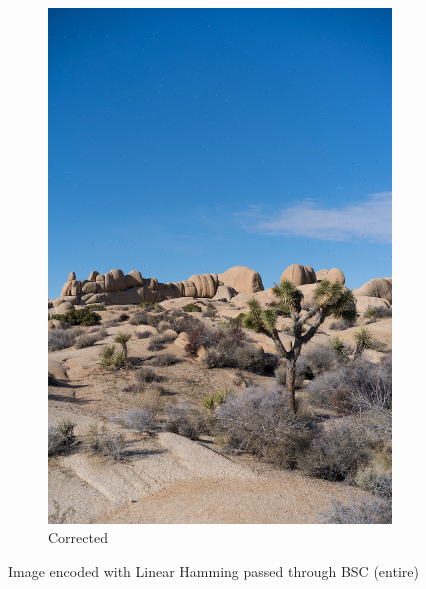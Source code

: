\documentclass{article}
\begin{document}
\begin{figure}[htb]
\begin{subfigure}[b]{0.32\textwidth}
        \includegraphics[width=\textwidth]{../Result/Linear/linear-bsc-output-syndrome-corrected.png}
        \caption{Corrected}
        \label{fig:image-linear-bsc-syndrome-corrected}
    \end{subfigure}
       \caption{Image encoded with Linear Hamming passed through BSC (entire)}
       \label{fig:image-linear-bsc}
\end{figure}
\end{document}
